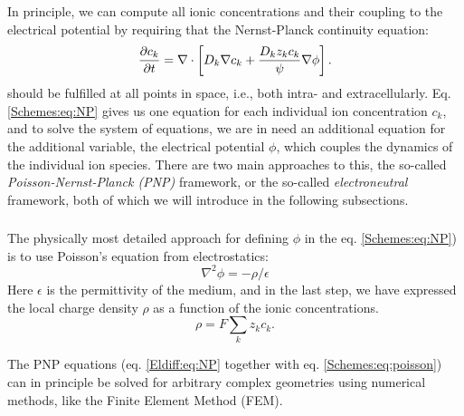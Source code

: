 In principle, we can compute all ionic concentrations and their coupling to the electrical potential by requiring that the Nernst-Planck continuity equation:
\begin{equation}
\frac{\partial c_k}{\partial t} = {\bf \nabla} \cdot \left[{D_k} {\bf \nabla} c_k + \frac{D_k z_k c_k}{\psi} {\bf \nabla} \phi \right].
\label{Schemes:eq:NP}
\end{equation}
should be fulfilled at all points in space, i.e., both intra- and extracellularly. Eq. \ref{Schemes:eq:NP} gives us one equation for each individual ion concentration $c_k$, and to solve the system of equations, we are in need an additional equation for the additional variable, the electrical potential $\phi$, which couples the dynamics of the individual ion species. There are two main approaches to this, the so-called \textit{Poisson-Nernst-Planck (PNP)} framework, or the so-called \textit{electroneutral} framework, both of which we will introduce in the following subsections. 


\subsubsection{}
\label{sec:Schemes:PNP}
The physically most detailed approach for defining $\phi$ in the eq. \ref{Schemes:eq:NP}) is to use Poisson's equation from electrostatics:
\begin{equation}
\nabla^2 \phi = -\rho/\epsilon
\label{Schemes:eq:poisson}
\end{equation}
Here $\epsilon$ is the permittivity of the medium, and in the last step, we have expressed the local charge density $\rho$ as a function of the ionic concentrations. 
\begin{equation}
\rho = F\sum_k z_k c_k.
\label{Schemes:eq:PNPrho}
\end{equation}

The PNP equations (eq. \ref{Eldiff:eq:NP} together with eq. \ref{Schemes:eq:poisson}) can in principle be solved for arbitrary complex geometries using numerical methods, like the Finite Element Method (FEM). 

